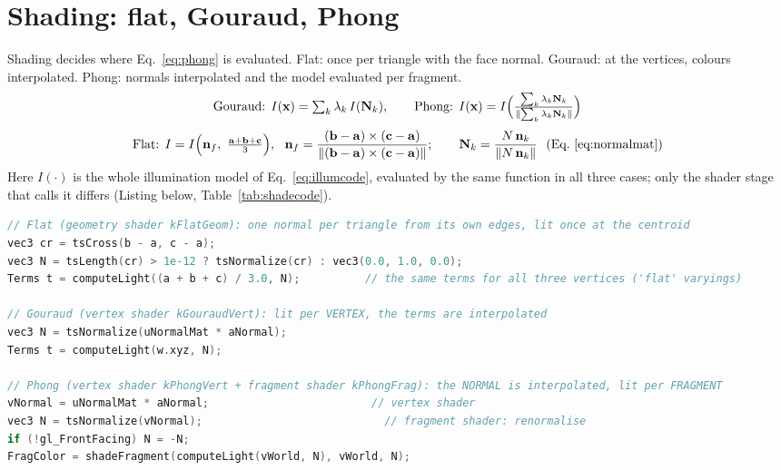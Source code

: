 \section{Shading: flat, Gouraud, Phong}
\label{sec:shading}
Shading decides where Eq.~\eqref{eq:phong} is evaluated. Flat: once per triangle with the face normal.
Gouraud: at the vertices, colours interpolated. Phong: normals interpolated and the model evaluated per fragment.
\begin{equation}
\text{Gouraud: } I(\mathbf{x})=\textstyle\sum_k\lambda_k\,I(\mathbf{N}_k),\qquad
\text{Phong: } I(\mathbf{x})=I\Big(\frac{\sum_k\lambda_k\mathbf{N}_k}{\lVert\sum_k\lambda_k\mathbf{N}_k\rVert}\Big)
\label{eq:shading}
\end{equation}
\begin{equation}
\text{Flat: } I=I\Big(\vect n_f,\ \tfrac{\vect a+\vect b+\vect c}{3}\Big),\ \ \vect n_f=\frac{(\vect b-\vect a)\times(\vect c-\vect a)}{\lVert(\vect b-\vect a)\times(\vect c-\vect a)\rVert};\qquad
\vect N_k=\frac{N\,\vect n_k}{\lVert N\,\vect n_k\rVert}\ \ (\text{Eq.~\eqref{eq:normalmat}})\label{eq:flat}
\end{equation}
Here $I(\cdot)$ is the whole illumination model of Eq.~\eqref{eq:illumcode}, evaluated by the same  function
 in all three cases; only the shader stage that calls it differs (Listing below, Table~\ref{tab:shadecode}).
\begin{lstlisting}[language=C++,caption={Where \code{computeLight} runs in each model (\code{src/rendering/ShaderSources.cpp}, OpenGL Shading Language).}]
// Flat (geometry shader kFlatGeom): one normal per triangle from its own edges, lit once at the centroid
vec3 cr = tsCross(b - a, c - a);
vec3 N = tsLength(cr) > 1e-12 ? tsNormalize(cr) : vec3(0.0, 1.0, 0.0);
Terms t = computeLight((a + b + c) / 3.0, N);          // the same terms for all three vertices ('flat' varyings)

// Gouraud (vertex shader kGouraudVert): lit per VERTEX, the terms are interpolated
vec3 N = tsNormalize(uNormalMat * aNormal);
Terms t = computeLight(w.xyz, N);

// Phong (vertex shader kPhongVert + fragment shader kPhongFrag): the NORMAL is interpolated, lit per FRAGMENT
vNormal = uNormalMat * aNormal;                         // vertex shader
vec3 N = tsNormalize(vNormal);                            // fragment shader: renormalise
if (!gl_FrontFacing) N = -N;
FragColor = shadeFragment(computeLight(vWorld, N), vWorld, N);
\end{lstlisting}

